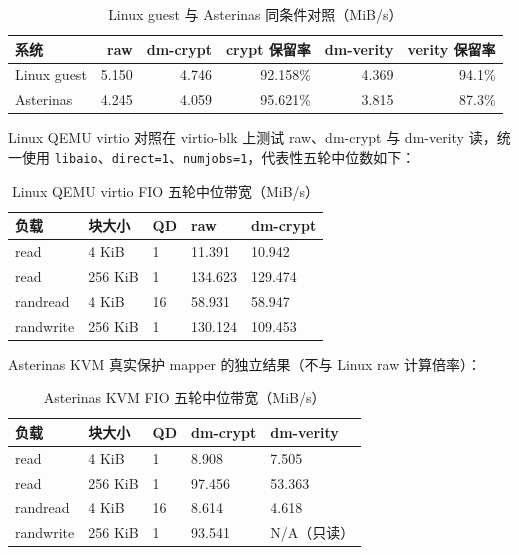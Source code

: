 \begin{table}[H]
    \centering
    \small
    \caption{Linux guest 与 Asterinas 同条件对照（MiB/s）}
    \begin{tabular}{lrrrrr}
        \toprule
        \textbf{系统} & \textbf{raw} & \textbf{dm-crypt} & \textbf{crypt 保留率} & \textbf{dm-verity} & \textbf{verity 保留率} \\
        \midrule
        Linux guest & 5.150 & 4.746 & 92.158\% & 4.369 & 94.1\% \\
        Asterinas & 4.245 & 4.059 & 95.621\% & 3.815 & 87.3\% \\
        \bottomrule
    \end{tabular}
\end{table}

Linux QEMU virtio 对照在 virtio-blk 上测试 raw、dm-crypt 与 dm-verity 读，统一使用 \texttt{libaio}、\texttt{direct=1}、\texttt{numjobs=1}，代表性五轮中位数如下：

\begin{table}[H]
    \centering
    \caption{Linux QEMU virtio FIO 五轮中位带宽（MiB/s）}
    \begin{tabular}{p{}p{}p{}p{}p{}}
        \toprule
        \textbf{负载} & \textbf{块大小} & \textbf{QD} & \textbf{raw} & \textbf{dm-crypt} \\
        \midrule
        read & 4 KiB & 1 & 11.391 & 10.942 \\
        read & 256 KiB & 1 & 134.623 & 129.474 \\
        randread & 4 KiB & 16 & 58.931 & 58.947 \\
        randwrite & 256 KiB & 1 & 130.124 & 109.453 \\
        \bottomrule
    \end{tabular}
\end{table}

Asterinas KVM 真实保护 mapper 的独立结果（不与 Linux raw 计算倍率）：

\begin{table}[H]
    \centering
    \caption{Asterinas KVM FIO 五轮中位带宽（MiB/s）}
    \begin{tabular}{p{}p{}p{}p{}p{}}
        \toprule
        \textbf{负载} & \textbf{块大小} & \textbf{QD} & \textbf{dm-crypt} & \textbf{dm-verity} \\
        \midrule
        read & 4 KiB & 1 & 8.908 & 7.505 \\
        read & 256 KiB & 1 & 97.456 & 53.363 \\
        randread & 4 KiB & 16 & 8.614 & 4.618 \\
        randwrite & 256 KiB & 1 & 93.541 & N/A（只读） \\
        \bottomrule
    \end{tabular}
\end{table}

